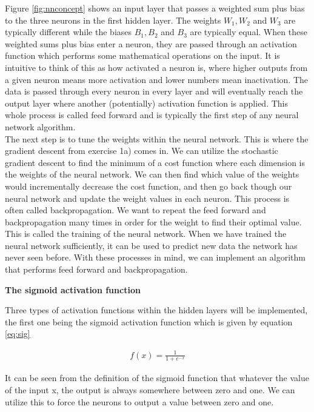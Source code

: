 \documentclass[12pt,a4paper]{article}
\begin{document}
\noindent Figure \ref{fig:nnconcept} shows an input layer that passes a weighted sum plus bias to the three neurons in the first hidden layer. The weights $W_1, W_2$ and $W_3$ are typically different while the biases $B_1, B_2$ and $B_3$ are typically equal. When these weighted sums plus bias enter a neuron, they are passed through an activation function which performs some mathematical operations on the input. It is intuitive to think of this as how activated a neuron is, where higher outputs from a given neuron means more activation and lower numbers mean inactivation. The data is passed through every neuron in every layer and will eventually reach the output layer where another (potentially) activation function is applied. This whole process is called feed forward and is typically the first step of any neural network algorithm.
\\
The next step is to tune the weights within the neural network. This is where the gradient descent from exercise 1a) comes in. We can utilize the stochastic gradient descent to find the minimum of a cost function where each dimension is the weights of the neural network. We can then find which value of the weights would incrementally decrease the cost function, and then go back though our neural network and update the weight values in each neuron. This process is often called backpropagation. We want to repeat the feed forward and backpropagation many times in order for the weight to find their optimal value. This is called the training of the neural network. When we have trained the neural network sufficiently, it can be used to predict new data the network has never seen before. With these processes in mind, we can implement an algorithm that performs feed forward and backpropagation.

\begin{center}
\large{\textbf{The sigmoid activation function}}
\end{center}

\noindent Three types of activation functions within the hidden layers will be implemented, the first one being the sigmoid activation function which is given by equation \ref{eq:sig}

\begin{equation}\label{eq:sig}
\begin{aligned}
f(x) = \frac{1}{1 + e^{-x}}
\end{aligned}
\end{equation}

\noindent It can be seen from the definition of the sigmoid function that whatever the value of the input x, the output is always somewhere between zero and one. We can utilize this to force the neurons to output a value between zero and one.
\end{document}
